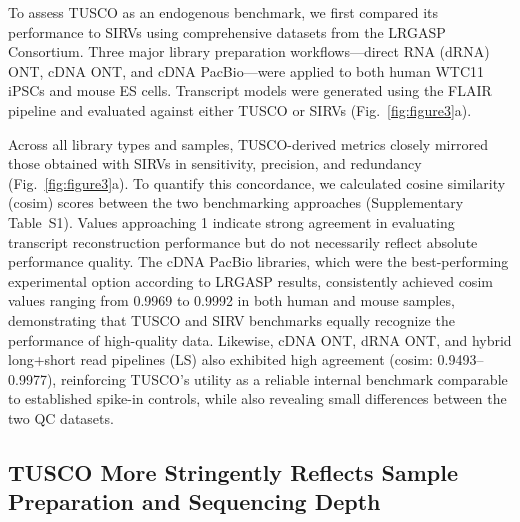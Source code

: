 \documentclass[pdflatex,sn-nature]{sn-jnl}%
\begin{document}
To assess TUSCO as an endogenous benchmark, we first compared its performance to SIRVs using comprehensive datasets from the LRGASP Consortium. Three major library preparation workflows---direct RNA (dRNA) ONT, cDNA ONT, and cDNA PacBio---were applied to both human WTC11 iPSCs and mouse ES cells. Transcript models were generated using the FLAIR~\cite{Tang2024FLAIR2} pipeline and evaluated against either TUSCO or SIRVs (Fig.~\ref{fig:figure3}a).

Across all library types and samples, TUSCO-derived metrics closely mirrored those obtained with SIRVs in sensitivity, precision, and redundancy (Fig.~\ref{fig:figure3}a). To quantify this concordance, we calculated cosine similarity (cosim) scores between the two benchmarking approaches (Supplementary Table~S1). Values approaching 1 indicate strong agreement in evaluating transcript reconstruction performance but do not necessarily reflect absolute performance quality. The cDNA PacBio libraries, which were the best-performing experimental option according to LRGASP results, consistently achieved cosim values ranging from 0.9969 to 0.9992 in both human and mouse samples, demonstrating that TUSCO and SIRV benchmarks equally recognize the performance of high-quality data. Likewise, cDNA ONT, dRNA ONT, and hybrid long+short read pipelines (LS) also exhibited high agreement (cosim: 0.9493--0.9977), reinforcing TUSCO's utility as a reliable internal benchmark comparable to established spike-in controls, while also revealing small differences between the two QC datasets.

\subsection{TUSCO More Stringently Reflects Sample Preparation and Sequencing Depth}
\end{document}
